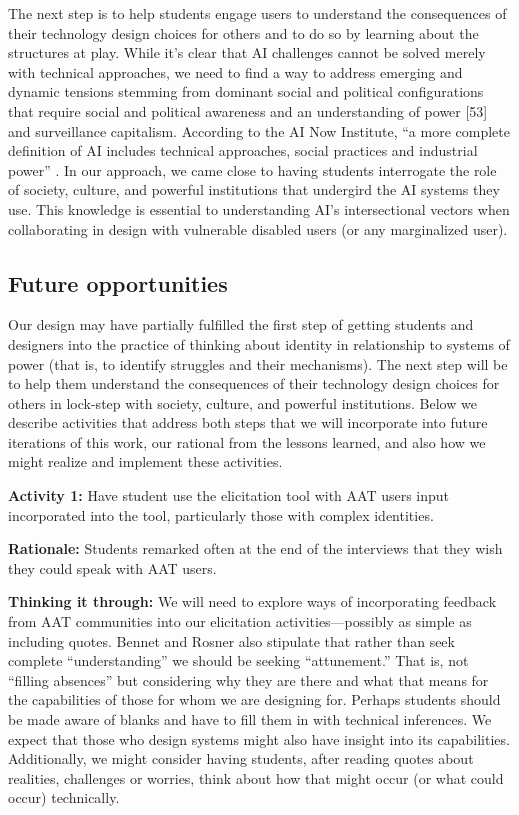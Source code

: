 \documentclass[11pt,dvipdfm]{article}
\begin{document}
The next step is to help students engage users to understand the consequences of their technology design choices for others and to do so by learning about the structures at play. While it’s clear that AI challenges cannot be solved merely with technical approaches, we need to find a way to address emerging and dynamic tensions stemming from dominant social and political configurations that require social and political awareness and an understanding of power [53] and surveillance capitalism. According to the AI Now Institute, “a more complete definition of AI includes technical approaches, social practices and industrial power” \cite{61}. In our approach, we came close to having students interrogate the role of society, culture, and powerful institutions that undergird the AI systems they use. This knowledge is essential to understanding AI’s intersectional vectors when collaborating in design with vulnerable disabled users (or any marginalized user).

\subsection{Future opportunities}
Our design may have partially fulfilled the first step of getting students and designers into the practice of thinking about identity in relationship to systems of power (that is, to identify struggles and their mechanisms). The next step will be to help them understand the consequences of their technology design choices for others in lock-step with society, culture, and powerful institutions. Below we describe activities that address both steps that we will incorporate into future iterations of this work, our rational from the lessons learned, and also how we might realize and implement these activities.

\textbf{Activity 1:} Have student use the elicitation tool with AAT users input incorporated into the tool, particularly those with complex identities.

\textbf{Rationale:}
Students remarked often at the end of the interviews that they wish they could speak with AAT users.

\textbf{Thinking it through:}
We will need to explore ways of incorporating feedback from AAT communities into our elicitation activities—possibly as simple as including quotes. Bennet and Rosner \cite{5} also stipulate that rather than seek complete “understanding” we should be seeking “attunement.” That is, not “filling absences” but considering why they are there and what that means for the capabilities of those for whom we are designing for. Perhaps students should be made aware of blanks and have to fill them in with technical inferences. We expect that those who design systems might also have insight into its capabilities. Additionally, we might consider having students, after reading quotes about realities, challenges or worries, think about how that might occur (or what could occur) technically.
\end{document}
